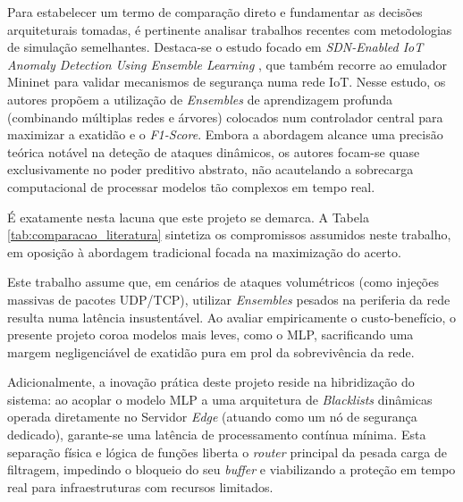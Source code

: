 Para estabelecer um termo de comparação direto e fundamentar as decisões arquiteturais tomadas, é pertinente analisar trabalhos recentes com metodologias de simulação semelhantes. Destaca-se o estudo focado em \textit{SDN-Enabled IoT Anomaly Detection Using Ensemble Learning} \cite{EnsembleSDN2020}, que também recorre ao emulador Mininet para validar mecanismos de segurança numa rede \ac{IoT}. Nesse estudo, os autores propõem a utilização de \textit{Ensembles} de aprendizagem profunda (combinando múltiplas redes e árvores) colocados num controlador central para maximizar a exatidão e o \textit{F1-Score}. Embora a abordagem alcance uma precisão teórica notável na deteção de ataques dinâmicos, os autores focam-se quase exclusivamente no poder preditivo abstrato, não acautelando a sobrecarga computacional de processar modelos tão complexos em tempo real.

É exatamente nesta lacuna que este projeto se demarca. A Tabela \ref{tab:comparacao_literatura} sintetiza os compromissos assumidos neste trabalho, em oposição à abordagem tradicional focada na maximização do acerto.

Este trabalho assume que, em cenários de ataques volumétricos (como injeções massivas de pacotes UDP/TCP), utilizar \textit{Ensembles} pesados na periferia da rede resulta numa latência insustentável. Ao avaliar empiricamente o custo-benefício, o presente projeto coroa modelos mais leves, como o \ac{MLP}, sacrificando uma margem negligenciável de exatidão pura em prol da sobrevivência da rede. 

Adicionalmente, a inovação prática deste projeto reside na hibridização do sistema: ao acoplar o modelo \ac{MLP} a uma arquitetura de \textit{Blacklists} dinâmicas operada diretamente no Servidor \textit{Edge} (atuando como um nó de segurança dedicado), garante-se uma latência de processamento contínua mínima. Esta separação física e lógica de funções liberta o \textit{router} principal da pesada carga de filtragem, impedindo o bloqueio do seu \textit{buffer} e viabilizando a proteção em tempo real para infraestruturas com recursos limitados.



